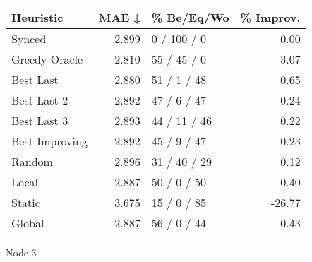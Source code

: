 \begin{tabular}{lrlr}
\toprule
\textbf{Heuristic} & \textbf{MAE ↓} & \textbf{\% Be/Eq/Wo} & \textbf{\% Improv.} \\
\midrule
            Synced &          2.899 &          0 / 100 / 0 &                0.00 \\
     Greedy Oracle &          2.810 &          55 / 45 / 0 &                3.07 \\
         Best Last &          2.880 &          51 / 1 / 48 &                0.65 \\
       Best Last 2 &          2.892 &          47 / 6 / 47 &                0.24 \\
       Best Last 3 &          2.893 &         44 / 11 / 46 &                0.22 \\
    Best Improving &          2.892 &          45 / 9 / 47 &                0.23 \\
            Random &          2.896 &         31 / 40 / 29 &                0.12 \\
             Local &          2.887 &          50 / 0 / 50 &                0.40 \\
            Static &          3.675 &          15 / 0 / 85 &              -26.77 \\
            Global &          2.887 &          56 / 0 / 44 &                0.43 \\
\bottomrule
\end{tabular}
\caption{Node 3}
\label{tab:hr_non_lr01_le2_bs2_3}
